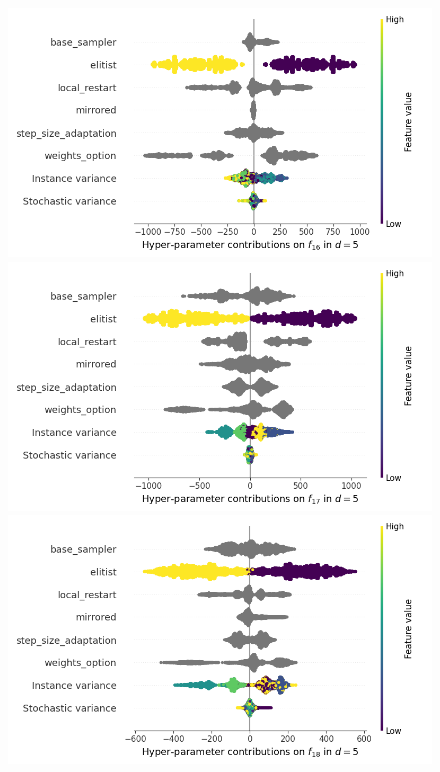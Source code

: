 \begin{figure}[t]
	\includegraphics[height=0.15\textheight,trim=60mm 0mm 0mm 0mm,clip]{images/img_summary_f16_d5.png}
	\includegraphics[height=0.15\textheight,trim=0mm 0mm 30mm 0mm,clip]{images/img_summary_f17_d5.png}
	\includegraphics[height=0.15\textheight,trim=60mm 0mm 30mm 0mm,clip]{images/img_summary_f18_d5.png}

\end{figure}
